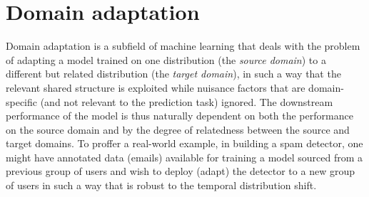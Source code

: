 \section{Domain adaptation}\label{sec:domain-adaptation}
Domain adaptation is a subfield of machine learning that deals with the problem of adapting a model
trained on one distribution (the \emph{source domain}) to a different but related distribution (the
\emph{target domain}), in such a way that the relevant shared structure is exploited while nuisance
factors that are domain-specific (and not relevant to the prediction task) ignored.
%
The downstream performance of the  model is thus naturally dependent on both the performance on the
source domain and by the degree of relatedness between the source and target domains.
%
To proffer a real-world example, in building a spam detector, one might have annotated data
(emails) available for training a model sourced from a previous group of users and wish to deploy
(adapt) the detector to a new group of users in such a way that is robust to the temporal
distribution shift.

